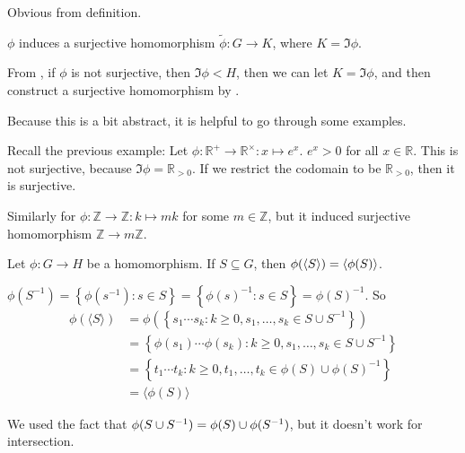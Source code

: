 \begin{pf}
Obvious from definition.
\end{pf}

\begin{corr}
$\phi$ induces a surjective homomorphism $\tilde{ \phi}:G\to K$, where $K=\Im\phi$.
\end{corr}

\begin{remark}
From , if $\phi$ is not surjective, then $\Im\phi <H$, then we can let $K=\Im\phi$, and then construct a surjective homomorphism by .

Because this is a bit abstract, it is helpful to go through some examples.

Recall the previous example: Let $\phi:\mathbb R^+\to \mathbb R^\times: x\mapsto e^x$. $e^x>0$ for all $x\in \mathbb R$. This is not surjective, because $\Im \phi = \mathbb R_{>0}$. If we restrict the codomain to be $\mathbb R_{>0}$, then it is surjective.

Similarly for $\phi:\mathbb Z\to \mathbb Z: k\mapsto mk$ for some $m\in \mathbb Z$, but it induced surjective homomorphism $\mathbb Z\to m\mathbb Z$.
\end{remark}

\begin{prop}
Let $\phi:G\to H$ be a homomorphism. If $S\subseteq G$, then $\phi(\left\langle S \right\rangle) = \left\langle \phi(S) \right\rangle$.
\end{prop}

\begin{pf}
$\phi\left(S^{-1}\right)=\left\{\phi\left(s^{-1}\right): s \in S\right\}=\left\{\phi(s)^{-1}: s \in S\right\}=\phi(S)^{-1}$. So 
$$
\begin{aligned}
\phi(\langle S\rangle) &=\phi\left(\left\{s_{1} \cdots s_{k}: k \geq 0, s_{1}, \ldots, s_{k} \in S \cup S^{-1}\right\}\right) \\
&=\left\{\phi\left(s_{1}\right) \cdots \phi\left(s_{k}\right): k \geq 0, s_{1}, \ldots, s_{k} \in S \cup S^{-1}\right\} \\
&=\left\{t_{1} \cdots t_{k}: k \geq 0, t_{1}, \ldots, t_{k} \in \phi(S) \cup \phi(S)^{-1}\right\} \\
&=\langle\phi(S)\rangle
\end{aligned}
$$
\end{pf}
\begin{remark}
We used the fact that $\phi(S\cup S^{-1}) = \phi(S)\cup \phi(S^{-1})$, but it doesn't work for intersection.
\end{remark}

